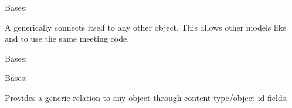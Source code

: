 \documentclass[letterpaper,10pt,english]{sphinxmanual}
\begin{document}
\begin{fulllineitems}
\label{generated/apps.reporting.models:apps.reporting.models.Meeting}
Bases: 

A  generically connects itself to any other object.  This allows other
models like  and  to use the same meeting code.


\begin{fulllineitems}
\label{generated/apps.reporting.models:apps.reporting.models.Meeting.DoesNotExist}
Bases: 

\end{fulllineitems}



\begin{fulllineitems}
\label{generated/apps.reporting.models:apps.reporting.models.Meeting.MultipleObjectsReturned}
Bases: 

\end{fulllineitems}



\begin{fulllineitems}
\label{generated/apps.reporting.models:apps.reporting.models.Meeting.accept_invitation}
\end{fulllineitems}



\begin{fulllineitems}
\label{generated/apps.reporting.models:apps.reporting.models.Meeting.content_object}
Provides a generic relation to any object through content-type/object-id
fields.

\end{fulllineitems}




\end{fulllineitems}
\end{document}
